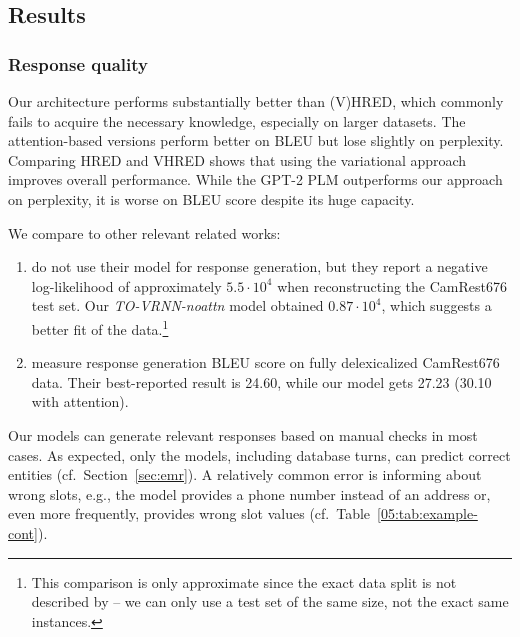 \subsection{Results}
\subsubsection{Response quality}
Our architecture performs substantially better than (V)HRED, which commonly fails to acquire the necessary knowledge, especially on larger datasets.
The attention-based versions perform better on BLEU but lose slightly on perplexity.
Comparing HRED and VHRED shows that using the variational approach improves overall performance.
While the GPT-2 PLM outperforms our approach on perplexity, it is worse on BLEU score despite its huge capacity.

We compare to other relevant related works:
\begin{enumerate}
\item \citet{shi2019unsupervised} do not use their model for response generation, but they report a negative log-likelihood of approximately $5.5 \cdot 10^{4}$ when reconstructing the CamRest676 test set. Our \emph{TO-VRNN-noattn} model obtained $0.87 \cdot 10^{4}$, which suggests a better fit of the data.\footnote{This comparison is only approximate since the exact data split is not described by \citet{shi2019unsupervised} -- we can only use a test set of the same size, not the exact same instances.}
\item \citet{wen2017latent} measure response generation BLEU score on fully delexicalized CamRest676 data. Their best-reported result is 24.60, while our model gets 27.23 (30.10 with attention).
\end{enumerate}

Our models can generate relevant responses based on manual checks in most cases.
As expected, only the models, including database turns, can predict correct entities (cf.~Section~\ref{sec:emr}).
A relatively common error is informing about wrong slots, e.g., the model provides a phone number instead of an address or, even more frequently, provides wrong slot values (cf.~Table~\ref{05:tab:example-cont}).

